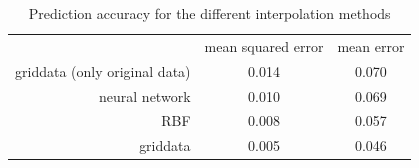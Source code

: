 \begin{table}[b]
	\centering 
	\begin{tabular}{rcc}
		& {mean squared error} & {mean error} \\
		griddata (only original data) &        0.014         &    0.070     \\
		neural network &        0.010         &    0.069     \\
		RBF &        0.008         &    0.057     \\
		griddata &        0.005         &    0.046
	\end{tabular}
	\caption{Prediction accuracy for the different interpolation methods}
	\label{tab:comparison}
\end{table}